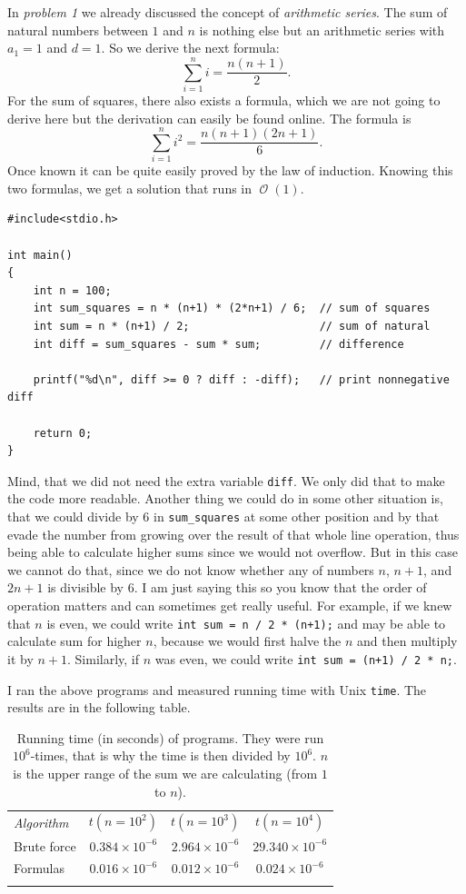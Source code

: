 \documentclass{book}
\DeclareMathOperator{\bigo}{\mathcal{O}}
\begin{document}
In \textit{problem 1} we already discussed the concept of \textit{arithmetic series}. The sum of natural numbers between $1$ and $n$ is nothing else but an arithmetic series with $a_1 = 1$ and $d = 1$. So we derive the next formula: \[\sum_{i=1}^n i = \frac{n(n+1)}{2}.\] For the sum of squares, there also exists a formula, which we are not going to derive here but the derivation can easily be found online. The formula is \[\sum_{i=1}^n i^2 = \frac{n(n+1)(2n+1)}{6}.\] Once known it can be quite easily proved by the law of induction. Knowing this two formulas, we get a solution that runs in $\bigo(1)$.

\begin{verbatim}
#include<stdio.h>

int main()
{
    int n = 100;
    int sum_squares = n * (n+1) * (2*n+1) / 6;  // sum of squares
    int sum = n * (n+1) / 2;                    // sum of natural
    int diff = sum_squares - sum * sum;         // difference

    printf("%d\n", diff >= 0 ? diff : -diff);   // print nonnegative diff

    return 0;
}
\end{verbatim}

Mind, that we did not need the extra variable \texttt{diff}. We only did that to make the code more readable. Another thing we could do in some other situation is, that we could divide by 6 in \texttt{sum\_squares} at some other position and by that evade the number from growing over the result of that whole line operation, thus being able to calculate higher sums since we would not overflow. But in this case we cannot do that, since we do not know whether any of numbers $n$, $n+1$, and $2n+1$ is divisible by $6$. I am just saying this so you know that the order of operation matters and can sometimes get really useful. For example, if we knew that $n$ is even, we could write \texttt{int sum = n / 2 * (n+1);} and may be able to calculate sum for higher $n$, because we would first halve the $n$ and then multiply it by $n+1$. Similarly, if $n$ was even, we could write \texttt{int sum = (n+1) / 2 * n;}.

I ran the above programs and measured running time with Unix \texttt{time}. The results are in the following table.

\begin{table}[h!]
\centering
\begin{tabular}{||l||c|c|c||}
\hhline{|t:====:t|}
\textit{Algorithm} & $t(n=10^2)$ & $t(n = 10^3)$ & $t(n=10^4)$\\ \hhline{||-||---||}
Brute force & $0.384 \times 10^{-6}$ & $2.964 \times 10^{-6}$ & $29.340 \times 10^{-6}$\\ \hhline{||-||---||}
Formulas & $0.016 \times 10^{-6}$ & $0.012 \times 10^{-6}$ & $0.024 \times 10^{-6}$ \\ \hhline{|b:====:b|}
\end{tabular}
\caption{Running time (in seconds) of programs. They were run $10^6$-times, that is why the time is then divided by $10^6$. $n$ is the upper range of the sum we are calculating (from $1$ to $n$).}
\end{table}
\end{document}
